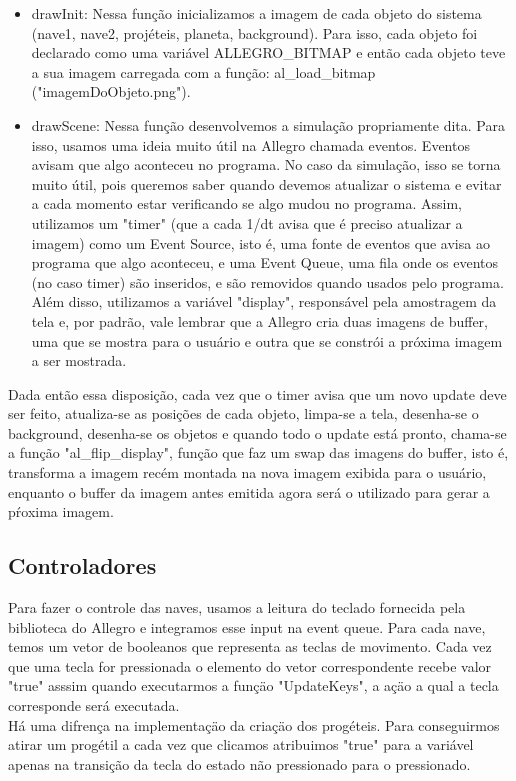 \documentclass{article}
\begin{document}
\begin{itemize}
  \item drawInit: Nessa função inicializamos a imagem de cada objeto do sistema (nave1, nave2, projéteis, planeta, background). Para isso, cada objeto foi declarado como
uma variável ALLEGRO\_BITMAP e então cada objeto teve a sua imagem carregada com a função: al\_load\_bitmap ("imagemDoObjeto.png").

  \item drawScene: Nessa função desenvolvemos a simulação propriamente dita. Para isso, usamos uma ideia muito útil na Allegro chamada eventos. Eventos avisam
que algo aconteceu no programa. No caso da simulação, isso se torna muito útil, pois queremos saber quando devemos atualizar o sistema e evitar a cada momento
estar verificando se algo mudou no programa. Assim, utilizamos um "timer" (que a cada 1/dt avisa que é preciso atualizar a imagem) como um Event Source, isto é,
uma fonte de eventos que avisa ao programa que algo aconteceu, e uma Event Queue, uma fila onde os eventos (no caso timer) são inseridos, e são removidos quando usados
pelo programa. Além disso, utilizamos a variável "display", responsável pela amostragem da tela e, por padrão, vale lembrar que a Allegro cria duas imagens de buffer,
uma que se mostra para o usuário e outra que se constrói a próxima imagem a ser mostrada.
\end{itemize}
Dada então essa disposição, cada vez que o timer avisa que um novo update deve ser feito, atualiza-se as posições de cada objeto, limpa-se a tela, desenha-se o background,
desenha-se os objetos e quando todo o update está pronto, chama-se a função "al\_flip\_display", função que faz um swap das imagens do buffer, isto é, transforma a imagem
recém montada na nova imagem exibida para o usuário, enquanto o buffer da imagem antes emitida agora será o utilizado para gerar a pŕoxima imagem.

\subsection{Controladores}
Para fazer o controle das naves, usamos a leitura do teclado fornecida pela biblioteca do Allegro e integramos esse input na event queue. Para cada nave, temos um vetor de booleanos que representa as teclas de movimento. Cada vez que uma tecla for pressionada o elemento do vetor correspondente recebe valor "true" asssim quando executarmos a funçäo "UpdateKeys", a açäo a qual a tecla corresponde será executada. \\
Há uma difrença na implementaçäo da criaçäo dos progéteis. Para conseguirmos atirar um progétil a cada vez que clicamos atribuimos "true" para a variável apenas na transição da tecla do estado não pressionado para o pressionado.
\end{document}

